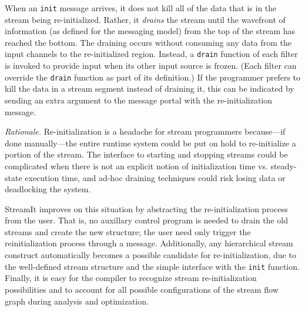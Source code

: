 When an \texttt{init} message arrives, it does not kill all of the
data that is in the stream being re-initialized.  Rather, it
\emph{drains} the stream until the wavefront of information (as
defined for the messaging model) from the top of the stream has
reached the bottom.  The draining occurs without consuming any data
from the input channels to the re-initialized region.  Instead, a
\texttt{drain} function of each filter is invoked to provide input
when its other input source is frozen.  (Each filter can override the
\texttt{drain} function as part of its definition.)  If the programmer
prefers to kill the data in a stream segment instead of draining it,
this can be indicated by sending an extra argument to the message
portal with the re-initialization message.

\emph{Rationale.}  Re-initialization is a headache for stream
programmers because---if done manually---the entire runtime system could
be put on hold to re-initialize a portion of the stream.  The
interface to starting and stopping streams could be complicated when
there is not an explicit notion of initialization time vs.
steady-state execution time, and ad-hoc draining techniques could risk
losing data or deadlocking the system.

StreamIt improves on this situation by abstracting the
re-initialization process from the user.  That is, no auxillary
control program is needed to drain the old streams and create the new
structure; the user need only trigger the reinitialization process
through a message.  Additionally, any hierarchical stream construct
automatically becomes a possible candidate for re-initialization, due
to the well-defined stream structure and the simple interface with the
\texttt{init} function.  Finally, it is easy for the compiler to
recognize stream re-initialization possibilities and to account for
all possible configurations of the stream flow graph during analysis
and optimization.


